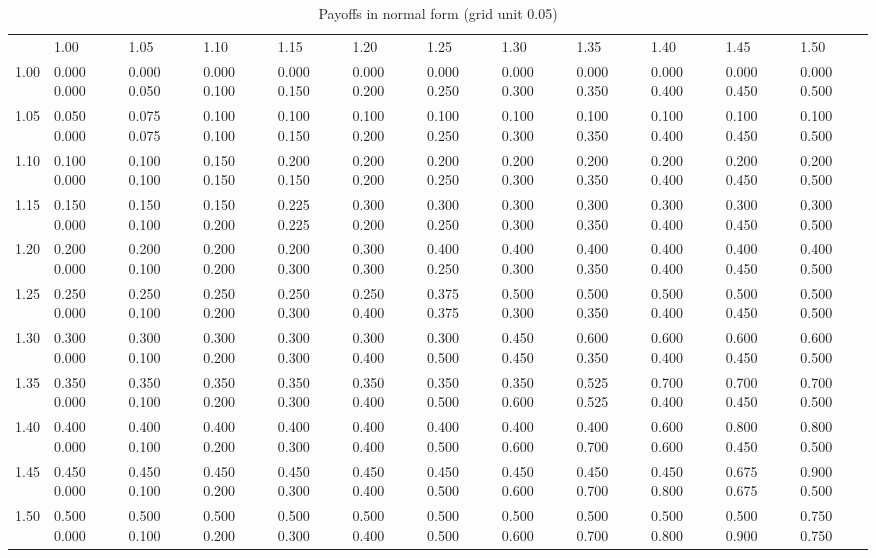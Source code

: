 \documentclass[11pt]{article}
\begin{document}


\newpage

\appendix

\begin{sidewaystable}
\footnotesize
\setlength{\tabcolsep}{2pt}
\caption{Payoffs in normal form (grid unit 0.05)}
\begin{tabular}{llllllllllll}
  {}    & 1.00       & 1.05         & 1.10       & 1.15        & 1.20        & 1.25        & 1.30         & 1.35       & 1.40        & 1.45        & 1.50      \\
  1.00 & 0.000 0.000 & 0.000 0.050 & 0.000 0.100 & 0.000 0.150 & 0.000 0.200 & 0.000 0.250 & 0.000 0.300 & 0.000 0.350 & 0.000 0.400 & 0.000 0.450 & 0.000 0.500 \\
  1.05 & 0.050 0.000 & 0.075 0.075 & 0.100 0.100 & 0.100 0.150 & 0.100 0.200 & 0.100 0.250 & 0.100 0.300 & 0.100 0.350 & 0.100 0.400 & 0.100 0.450 & 0.100 0.500 \\
  1.10 & 0.100 0.000 & 0.100 0.100 & 0.150 0.150 & 0.200 0.150 & 0.200 0.200 & 0.200 0.250 & 0.200 0.300 & 0.200 0.350 & 0.200 0.400 & 0.200 0.450 & 0.200 0.500 \\
  1.15 & 0.150 0.000 & 0.150 0.100 & 0.150 0.200 & 0.225 0.225 & 0.300 0.200 & 0.300 0.250 & 0.300 0.300 & 0.300 0.350 & 0.300 0.400 & 0.300 0.450 & 0.300 0.500 \\
  1.20 & 0.200 0.000 & 0.200 0.100 & 0.200 0.200 & 0.200 0.300 & 0.300 0.300 & 0.400 0.250 & 0.400 0.300 & 0.400 0.350 & 0.400 0.400 & 0.400 0.450 & 0.400 0.500 \\
  1.25 & 0.250 0.000 & 0.250 0.100 & 0.250 0.200 & 0.250 0.300 & 0.250 0.400 & 0.375 0.375 & 0.500 0.300 & 0.500 0.350 & 0.500 0.400 & 0.500 0.450 & 0.500 0.500 \\
  1.30 & 0.300 0.000 & 0.300 0.100 & 0.300 0.200 & 0.300 0.300 & 0.300 0.400 & 0.300 0.500 & 0.450 0.450 & 0.600 0.350 & 0.600 0.400 & 0.600 0.450 & 0.600 0.500 \\
  1.35 & 0.350 0.000 & 0.350 0.100 & 0.350 0.200 & 0.350 0.300 & 0.350 0.400 & 0.350 0.500 & 0.350 0.600 & 0.525 0.525 & 0.700 0.400 & 0.700 0.450 & 0.700 0.500 \\
  1.40 & 0.400 0.000 & 0.400 0.100 & 0.400 0.200 & 0.400 0.300 & 0.400 0.400 & 0.400 0.500 & 0.400 0.600 & 0.400 0.700 & 0.600 0.600 & 0.800 0.450 & 0.800 0.500 \\
  1.45 & 0.450 0.000 & 0.450 0.100 & 0.450 0.200 & 0.450 0.300 & 0.450 0.400 & 0.450 0.500 & 0.450 0.600 & 0.450 0.700 & 0.450 0.800 & 0.675 0.675 & 0.900 0.500 \\
  1.50 & 0.500 0.000 & 0.500 0.100 & 0.500 0.200 & 0.500 0.300 & 0.500 0.400 & 0.500 0.500 & 0.500 0.600 & 0.500 0.700 & 0.500 0.800 & 0.500 0.900 & 0.750 0.750 \\
\end{tabular}
\end{sidewaystable}
\end{document}
